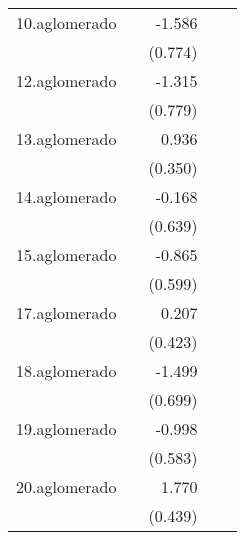 {\begin{longtable}{l*{4}{D{.}{.}{-1}}}
\addlinespace
10.aglomerado&                     &      -1.586\sym{*}  &                     &                     \\
            &                     &     (0.774)         &                     &                     \\
\addlinespace
12.aglomerado&                     &      -1.315         &                     &                     \\
            &                     &     (0.779)         &                     &                     \\
\addlinespace
13.aglomerado&                     &       0.936\sym{**} &                     &                     \\
            &                     &     (0.350)         &                     &                     \\
\addlinespace
14.aglomerado&                     &      -0.168         &                     &                     \\
            &                     &     (0.639)         &                     &                     \\
\addlinespace
15.aglomerado&                     &      -0.865         &                     &                     \\
            &                     &     (0.599)         &                     &                     \\
\addlinespace
17.aglomerado&                     &       0.207         &                     &                     \\
            &                     &     (0.423)         &                     &                     \\
\addlinespace
18.aglomerado&                     &      -1.499\sym{*}  &                     &                     \\
            &                     &     (0.699)         &                     &                     \\
\addlinespace
19.aglomerado&                     &      -0.998         &                     &                     \\
            &                     &     (0.583)         &                     &                     \\
\addlinespace
20.aglomerado&                     &       1.770\sym{***}&                     &                     \\
            &                     &     (0.439)         &                     &                     \\

\end{longtable}}
